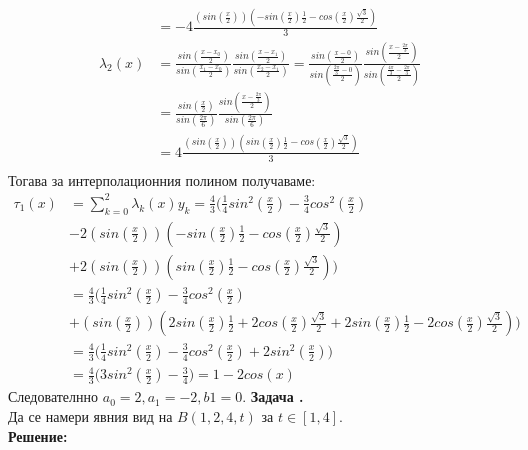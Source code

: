 \documentclass[12pt]{article}
\newcounter{problem}
\newcounter{solution}
\newcommand\problem{%
  \stepcounter{problem}%
  \textbf{Задача \theproblem.}~%
  \\
}
\newcommand\solution{%
  \textbf{Решение:}\\~%
}
\begin{document}
\begin{align*}
&=-4\frac{\left(sin\left(\frac{x}{2}\right)\right)
\left(-sin\left(\frac{x}{2}\right)\frac{1}{2}-cos\left(\frac{x}{2}\right)\frac{\sqrt3}{2}\right)}{3}\\
\lambda_2(x)&=\frac{sin\left(\frac{x-x_0}{2}\right)}{sin\left(\frac{x_1-x_0}{2}\right)}\frac{sin\left(\frac{x-x_1}{2}\right)}{sin\left(\frac{x_2-x_1}{2}\right)} = \frac{sin\left(\frac{x-0}{2}\right)}{sin\left(\frac{\frac{2\pi}{3}-0}{2}\right)}\frac{sin\left(\frac{x-\frac{2\pi}{3}}{2}\right)}{sin\left(\frac{\frac{4\pi}{3}-\frac{2\pi}{3}}{2}\right)} \\
&=\frac{sin\left(\frac{x}{2}\right)}{sin\left(\frac{2\pi}{6}\right)}\frac{sin\left(\frac{x-\frac{2\pi}{3}}{2}\right)}{sin\left(\frac{2\pi}{6}\right)} \\
&=4\frac{\left(sin\left(\frac{x}{2}\right)\right)
\left(sin\left(\frac{x}{2}\right)\frac{1}{2}-cos\left(\frac{x}{2}\right)\frac{\sqrt3}{2}\right)}{3}\\
\end{align*}
Тогава за интерполационния полином получаваме:
\begin{align*}
\tau_1(x)&=\sum_{k=0}^{2}\lambda_k(x)y_k =  \frac{4}{3}\Biggl(
\frac{1}{4}sin^2\left(\frac{x}{2}\right)-\frac{3}{4}cos^2\left(\frac{x}{2}\right)\\
&-2\left(sin\left(\frac{x}{2}\right)\right)
\left(-sin\left(\frac{x}{2}\right)\frac{1}{2}-cos\left(\frac{x}{2}\right)\frac{\sqrt3}{2}\right)\\&+2\left(sin\left(\frac{x}{2}\right)\right)
\left(sin\left(\frac{x}{2}\right)\frac{1}{2}-cos\left(\frac{x}{2}\right)\frac{\sqrt3}{2}\right)\Biggr)\\
&=\frac{4}{3}\Biggl(\frac{1}{4}sin^2\left(\frac{x}{2}\right)-\frac{3}{4}cos^2\left(\frac{x}{2}\right)\\
&+\left(sin\left(\frac{x}{2}\right)\right)
\left(2sin\left(\frac{x}{2}\right)\frac{1}{2}+2cos\left(\frac{x}{2}\right)\frac{\sqrt3}{2}
+2sin\left(\frac{x}{2}\right)\frac{1}{2}-2cos\left(\frac{x}{2}\right)\frac{\sqrt3}{2}\right)\Biggr)\\
&=\frac{4}{3}\Biggl(\frac{1}{4}sin^2\left(\frac{x}{2}\right)-\frac{3}{4}cos^2\left(\frac{x}{2}\right)+2sin^2\left(\frac{x}{2}\right)\Biggr)\\
&=\frac{4}{3}\biggl(3sin^2\left(\frac{x}{2}\right)-\frac{3}{4}\biggr)=
\boxed{1-2cos(x)}
\end{align*}
Следователнно $a_0=2, a_1=-2, b1=0$.
\problem
Да се намери явния вид на $B(1,2,4,t)$ за $t\in[1,4]$.\\
\solution
\end{document}

